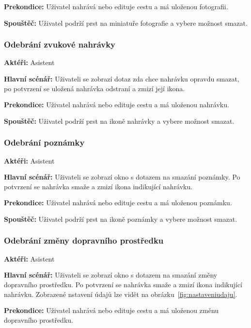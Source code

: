 \documentclass{article}
\newcommand{\usecase}[2]{\subsubsection{#1}\label{#2}}
\begin{document}
\vspace{0.1cm}
\noindent
\textbf{Prekondice:} Uživatel nahrává nebo edituje cestu a má uloženou fotografii.

\vspace{0.1cm}
\noindent
\textbf{Spouštěč:} Uživatel podrží prst na miniatuře fotografie a vybere možnost smazat.



\usecase{Odebrání zvukové nahrávky}{odebraninahravky}
\textbf{Aktéři:} Asistent

\vspace{0.1cm}
\noindent
\textbf{Hlavní scénář:} Uživateli se zobrazí dotaz zda chce nahrávku opravdu smazat, po potvrzení
se uložená nahrávka odstraní a zmizí její ikona.

\vspace{0.1cm}
\noindent
\textbf{Prekondice:} Uživatel nahrává nebo edituje cestu a má uloženou nahrávku.

\vspace{0.1cm}
\noindent
\textbf{Spouštěč:} Uživatel podrží prst na ikoně nahrávky a vybere možnost smazat.



\usecase{Odebrání poznámky}{odebranipoznamky}
\textbf{Aktéři:} Asistent

\vspace{0.1cm}
\noindent
\textbf{Hlavní scénář:} Uživateli se zobrazí okno s dotazem na smazání poznámky. Po potvrzení se
nahrávka smaže a zmizí ikona indikující nahrávku.

\vspace{0.1cm}
\noindent
\textbf{Prekondice:} Uživatel nahrává nebo edituje cestu a má uloženou poznámku.

\vspace{0.1cm}
\noindent
\textbf{Spouštěč:} Uživatel podrží prst na ikoně poznámky a vybere možnost smazat.


\usecase{Odebrání změny dopravního prostředku}{odebranizmenyprostredku}
\textbf{Aktéři:} Asistent

\vspace{0.1cm}
\noindent
\textbf{Hlavní scénář:} Uživateli se zobrazí okno s dotazem na smazání změny dopravního prostředku.
Po potvrzení se nahrávka smaže a zmizí ikona indikující nahrávku. Zobrazené nstavení údajů
lze vidět na obrázku~\ref{fig:nastaveniudaju}.

\vspace{0.1cm}
\noindent
\textbf{Prekondice:} Uživatel nahrává nebo edituje cestu a má uloženou změnu dopravního prostředku.
\end{document}

